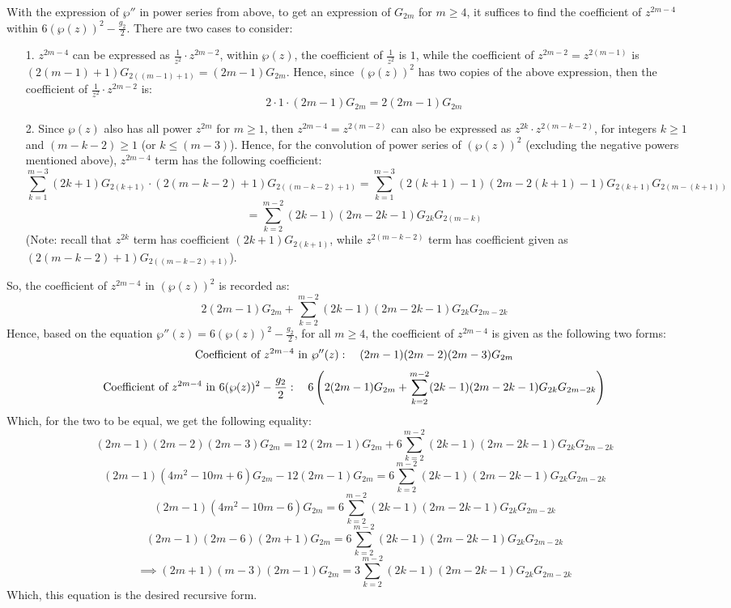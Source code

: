 \documentclass{article}
\begin{document}
With the expression of $\wp''$ in power series from above, to get an expression of $G_{2m}$ for $m\geq 4$, it suffices to find the coefficient of $z^{2m-4}$ within $6(\wp(z))^2-\frac{g_2}{2}$.
There are two cases to consider:
\begin{itemize}
    \item[1.] $z^{2m-4}$ can be expressed as $\frac{1}{z^2}\cdot z^{2m-2}$, within $\wp(z)$, the coefficient of $\frac{1}{z^2}$ is $1$, while the coefficient of $z^{2m-2}=z^{2(m-1)}$ is $(2(m-1)+1)G_{2((m-1)+1)} = (2m-1)G_{2m}$.
    Hence, since $(\wp(z))^2$ has two copies of the above expression, then the coefficient of $\frac{1}{z^2}\cdot z^{2m-2}$ is:
    $$2\cdot 1\cdot (2m-1)G_{2m} = 2(2m-1)G_{2m}$$
    \item[2.] Since $\wp(z)$ also has all power $z^{2m}$ for $m\geq 1$, then $z^{2m-4}=z^{2(m-2)}$ can also be expressed as $z^{2k}\cdot z^{2(m-k-2)}$, for integers $k\geq 1$ and $(m-k-2)\geq 1 $
    (or $k\leq (m-3)$). Hence, for the convolution of power series of $(\wp(z))^2$ (excluding the negative powers mentioned above), $z^{2m-4}$ term has the following coefficient:
    $$\sum_{k=1}^{m-3}(2k+1)G_{2(k+1)}\cdot (2(m-k-2)+1)G_{2((m-k-2)+1)} = \sum_{k=1}^{m-3}(2(k+1)-1)(2m-2(k+1)-1)G_{2(k+1)}G_{2(m-(k+1))}$$
    $$ = \sum_{k=2}^{m-2}(2k-1)(2m-2k-1)G_{2k}G_{2(m-k)}$$
    (Note: recall that $z^{2k}$ term has coefficient $(2k+1)G_{2(k+1)}$, while $z^{2(m-k-2)}$ term has coefficient given as $(2(m-k-2)+1)G_{2((m-k-2)+1)}$).
\end{itemize}
So, the coefficient of $z^{2m-4}$ in $(\wp(z))^2$ is recorded as:
$$2(2m-1)G_{2m}+\sum_{k=2}^{m-2}(2k-1)(2m-2k-1)G_{2k}G_{2m-2k}$$
Hence, based on the equation $\wp''(z)=6(\wp(z))^2-\frac{g_2}{2}$, for all $m\geq 4$, the coefficient of $z^{2m-4}$ is given as the following two forms:
$$\textmd{Coefficient of } z^{2m-4} \textmd{ in } \wp''(z):\quad (2m-1)(2m-2)(2m-3)G_{2m}$$
$$\textmd{Coefficient of } z^{2m-4} \textmd{ in } 6(\wp(z))^2-\frac{g_2}{2}:\quad 6\left(2(2m-1)G_{2m}+\sum_{k=2}^{m-2}(2k-1)(2m-2k-1)G_{2k}G_{2m-2k}\right)$$
Which, for the two to be equal, we get the following equality:
$$(2m-1)(2m-2)(2m-3)G_{2m}=12(2m-1)G_{2m}+6\sum_{k=2}^{m-2}(2k-1)(2m-2k-1)G_{2k}G_{2m-2k}$$
$$(2m-1)(4m^2-10m+6)G_{2m}-12(2m-1)G_{2m}=6\sum_{k=2}^{m-2}(2k-1)(2m-2k-1)G_{2k}G_{2m-2k}$$
$$(2m-1)(4m^2-10m-6)G_{2m}=6\sum_{k=2}^{m-2}(2k-1)(2m-2k-1)G_{2k}G_{2m-2k}$$
$$(2m-1)(2m-6)(2m+1)G_{2m}=6\sum_{k=2}^{m-2}(2k-1)(2m-2k-1)G_{2k}G_{2m-2k}$$
$$\implies (2m+1)(m-3)(2m-1)G_{2m}=3\sum_{k=2}^{m-2}(2k-1)(2m-2k-1)G_{2k}G_{2m-2k}$$
Which, this equation is the desired recursive form.
\end{document}
